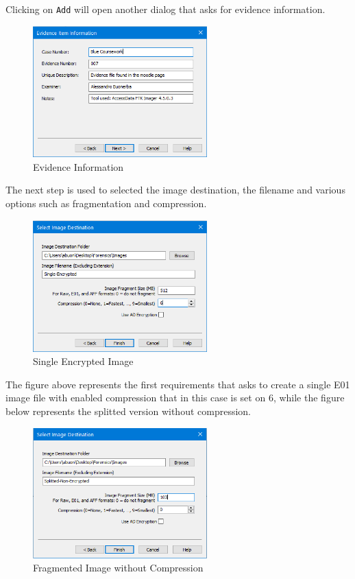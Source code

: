 Clicking on \lstinline{Add} will open another dialog that asks for evidence
information.

\begin{figure}[H]
  \centering
  \includegraphics[width=0.6\textwidth]{figures/evidence-information}
  \caption{Evidence Information}
  \label{f:evidence-information}
\end{figure}

The next step is used to selected the image destination, the filename and
various options such as fragmentation and compression.

\begin{figure}[H]
  \centering
  \includegraphics[width=0.6\textwidth]{figures/single-encrypted}
  \caption{Single Encrypted Image}
  \label{f:single-encrypted}
\end{figure}

The figure above represents the first requirements that asks to create a single
E01 image file with enabled compression that in this case is set on 6, while the
figure below represents the splitted version without compression.

\begin{figure}[H]
  \centering
  \includegraphics[width=0.6\textwidth]{figures/splitted-no-compression}
  \caption{Fragmented Image without Compression}
  \label{f:splitted-no-compression}
\end{figure}

